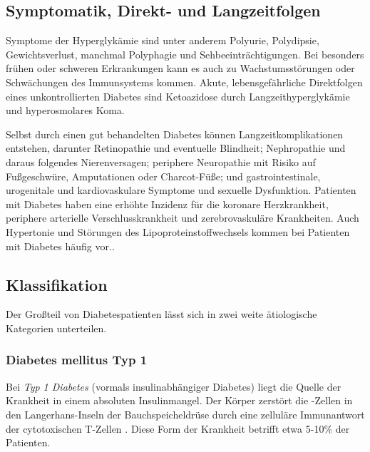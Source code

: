 \documentclass{article}
\begin{document}
\subsection{Symptomatik, Direkt- und Langzeitfolgen}

Symptome der Hyperglykämie sind unter anderem Polyurie, Polydipsie, Gewichtsverlust, manchmal Polyphagie und Sehbeeinträchtigungen\footnotemark \cite{ada}. Bei besonders frühen oder schweren Erkrankungen kann es auch zu Wachstumsstörungen oder Schwächungen des Immunsystems kommen. Akute, lebensgefährliche Direktfolgen eines unkontrollierten Diabetes sind Ketoazidose durch Langzeithyperglykämie und hyperosmolares Koma\footnotemark[\value{footnote}] \cite{who}.


Selbst durch einen gut behandelten Diabetes können Langzeitkomplikationen entstehen, darunter Retinopathie und eventuelle Blindheit; Nephropathie und daraus folgendes Nierenversagen; periphere Neuropathie mit Risiko auf Fußgeschwüre, Amputationen oder Charcot-Füße; und gastrointestinale, urogenitale und kardiovaskulare Symptome und sexuelle Dysfunktion\footnotemark[\value{footnote}]. Patienten  mit Diabetes haben eine erhöhte Inzidenz für die koronare Herzkrankheit, periphere arterielle  Verschlusskrankheit und zerebrovaskuläre Krankheiten. Auch Hypertonie und Störungen des Lipoproteinstoffwechsels kommen bei Patienten mit Diabetes häufig vor.\footnotemark[\value{footnote}]. \cite{ada}

\newpage

\subsection{Klassifikation}

Der Großteil von Diabetespatienten lässt sich in zwei weite ätiologische Kategorien unterteilen. 

\subsubsection{Diabetes mellitus Typ 1}

Bei \textit{Typ 1 Diabetes} (vormals \glqq insulinabhängiger Diabetes\grqq{}) liegt die Quelle der Krankheit in einem absoluten Insulinmangel. Der Körper zerstört die \textbeta-Zellen in den Langerhans-Inseln der Bauchspeicheldrüse durch eine zelluläre Immunantwort der cytotoxischen T-Zellen \cite{ada}. Diese Form der Krankheit betrifft etwa 5-10\% der Patienten. 
\end{document}
